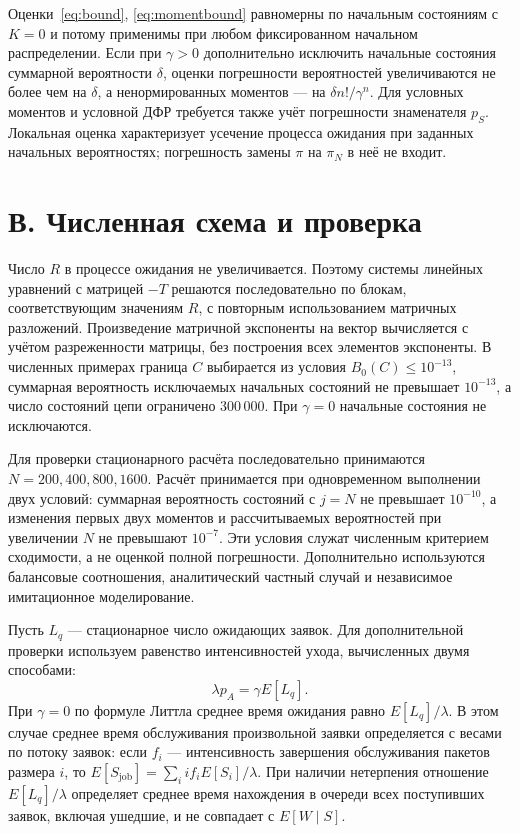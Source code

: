 Оценки~\eqref{eq:bound}, \eqref{eq:momentbound} равномерны по начальным состояниям с $K=0$ и потому применимы при любом фиксированном начальном распределении. Если при $\gamma>0$ дополнительно исключить начальные состояния суммарной вероятности $\delta$, оценки погрешности вероятностей увеличиваются не более чем на $\delta$, а ненормированных моментов --- на $\delta n!/\gamma^n$. Для условных моментов и условной ДФР требуется также учёт погрешности знаменателя $p_S$. Локальная оценка характеризует усечение процесса ожидания при заданных начальных вероятностях; погрешность замены $\pi$ на $\pi_N$ в неё не входит.

\section*{В. Численная схема и проверка}

Число $R$ в процессе ожидания не увеличивается. Поэтому системы линейных уравнений с матрицей $-T$ решаются последовательно по блокам, соответствующим значениям $R$, с повторным использованием матричных разложений. Произведение матричной экспоненты на вектор вычисляется с учётом разреженности матрицы, без построения всех элементов экспоненты. В численных примерах граница $C$ выбирается из условия $B_0(C)\leq10^{-13}$, суммарная вероятность исключаемых начальных состояний не превышает $10^{-13}$, а число состояний цепи ограничено 300\,000. При $\gamma=0$ начальные состояния не исключаются.

Для проверки стационарного расчёта последовательно принимаются $N=200,400,800,1600$. Расчёт принимается при одновременном выполнении двух условий: суммарная вероятность состояний с $j=N$ не превышает $10^{-10}$, а изменения первых двух моментов и рассчитываемых вероятностей при увеличении $N$ не превышают $10^{-7}$. Эти условия служат численным критерием сходимости, а не оценкой полной погрешности. Дополнительно используются балансовые соотношения, аналитический частный случай и независимое имитационное моделирование.

Пусть $L_q$ --- стационарное число ожидающих заявок. Для дополнительной проверки используем равенство интенсивностей ухода, вычисленных двумя способами:
\begin{equation}\label{eq:flow}
 \lambda p_A=\gamma E[L_q].
\end{equation}
При $\gamma=0$ по формуле Литтла среднее время ожидания равно $E[L_q]/\lambda$. В этом случае среднее время обслуживания произвольной заявки определяется с весами по потоку заявок: если $f_i$ --- интенсивность завершения обслуживания пакетов размера $i$, то $E[S_{\mathrm{job}}]=\sum_i i f_i E[S_i]/\lambda$. При наличии нетерпения отношение $E[L_q]/\lambda$ определяет среднее время нахождения в очереди всех поступивших заявок, включая ушедшие, и не совпадает с $E[W\mid S]$.


